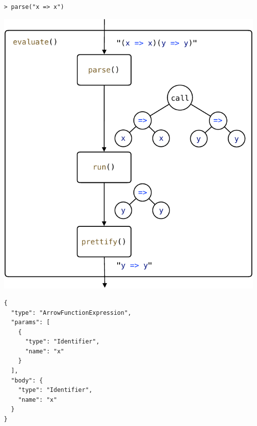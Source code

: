 \documentclass[12pt, oneside]{book}
\begin{document}
\begin{verbatim}
> parse("x => x")
\end{verbatim}
\includegraphics[page = 2]{images.pdf}
\begin{verbatim}
{
  "type": "ArrowFunctionExpression",
  "params": [
    {
      "type": "Identifier",
      "name": "x"
    }
  ],
  "body": {
    "type": "Identifier",
    "name": "x"
  }
}
\end{verbatim}
\end{document}
